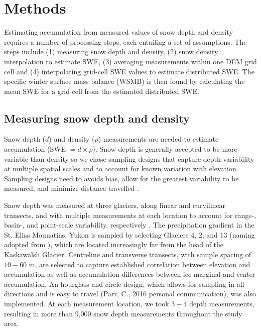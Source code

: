 \documentclass[twocolumn,letterpaper]{igs}
\begin{document}


\section{Methods}

Estimating accumulation from measured values of snow depth and density requires a number of processing steps, each entailing a set of assumptions.  The steps include (1) measuring snow depth and density, (2) snow density interpolation to estimate SWE, (3) averaging measurements within one DEM grid cell and (4) interpolating grid-cell SWE values to estimate distributed SWE. The specific winter surface mass balance (WSMB) is then found by calculating the mean SWE for a grid cell from the estimated distributed SWE. 

\subsection{Measuring snow depth and density}

Snow depth ($d$) and density ($\rho$) measurements are needed to estimate accumulation (SWE $= d \times \rho$). Snow depth is generally accepted to be more variable than density  \citep{Elder1991, Clark2011, Lopez2013} so we chose sampling designs that capture depth variability at multiple spatial scales and to account for known variation with elevation. Sampling designs need to avoids bias, allow for the greatest variability to be measured, and minimize distance travelled \citep{Shea2010}.

Snow depth was measured at three glaciers, along linear and curvilinear transects, and with multiple measurements at each location to account for range-, basin-, and point-scale variability, respectively \citep{Clark2011}. The precipitation gradient in the St. Elias Mounatins, Yukon \citep{Taylor1969} is sampled by selecting Glaciers 4, 2, and 13 (naming adopted from \cite{Crompton2016}), which are located increasingly far from the head of the Kaskawalsh Glacier. Centreline and transverse transects, with sample spacing of $10-60$ m, are selected to capture established correlation between elevation and accumulation \citep[e.g.][]{Machguth2006,Walmsley2015} as well as accumulation differences between ice-marginal and center accumulation. An hourglass and circle design, which allows for sampling in all directions and is easy to travel (Parr, C., 2016 personal communication), was also implemented. At each measurement location, we took $3-4$ depth measurements, resulting in more than 9,000 snow depth measurements throughout the study area. 
\end{document}

